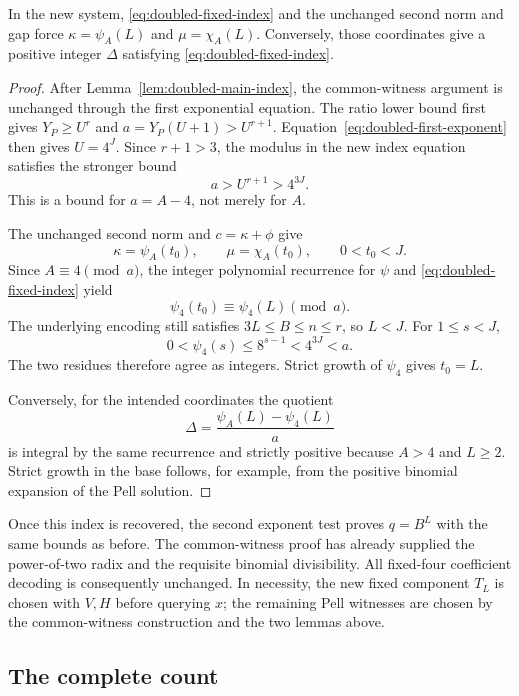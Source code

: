 \begin{lemma}\label{lem:doubled-fixed-index}
In the new system, \eqref{eq:doubled-fixed-index} and the unchanged
second norm and gap force
$\kappa=\psi_A(L)$ and $\mu=\chi_A(L)$.
Conversely, those coordinates give a positive integer $\Delta$
satisfying \eqref{eq:doubled-fixed-index}.
\end{lemma}
\begin{proof}
After Lemma~\ref{lem:doubled-main-index}, the common-witness argument
is unchanged through the first exponential equation. The ratio lower
bound first gives $Y_P\ge U^r$ and
$a=Y_P(U+1)>U^{r+1}$. Equation~\eqref{eq:doubled-first-exponent}
then gives $U=4^J$. Since $r+1>3$, the modulus in the new index
equation satisfies the stronger bound
\begin{equation}\label{eq:doubled-modulus-growth}
 a>U^{r+1}>4^{3J}.
\end{equation}
This is a bound for $a=A-4$, not merely for $A$.

The unchanged second norm and $c=\kappa+\phi$ give
\[
 \kappa=\psi_A(t_0),\qquad \mu=\chi_A(t_0),\qquad 0<t_0<J.
\]
Since $A\equiv4\pmod a$, the integer polynomial recurrence for
$\psi$ and \eqref{eq:doubled-fixed-index} yield
\[
 \psi_4(t_0)\equiv\psi_4(L)\pmod a.
\]
The underlying encoding still satisfies $3L\le B\le n\le r$,
so $L<J$. For $1\le s<J$,
\[
 0<\psi_4(s)\le8^{s-1}<4^{3J}<a.
\]
The two residues therefore agree as integers. Strict growth of
$\psi_4$ gives $t_0=L$.

Conversely, for the intended coordinates the quotient
\[
 \Delta=\frac{\psi_A(L)-\psi_4(L)}a
\]
is integral by the same recurrence and strictly positive because
$A>4$ and $L\ge2$. Strict growth in the base follows, for example,
from the positive binomial expansion of the Pell solution.
\end{proof}

Once this index is recovered, the second exponent test proves
$q=B^L$ with the same bounds as before. The common-witness proof has
already supplied the power-of-two radix and the requisite binomial
divisibility. All fixed-four coefficient decoding is consequently
unchanged. In necessity, the new fixed component $T_L$ is chosen with
$V,H$ before querying $x$; the remaining Pell witnesses are chosen by
the common-witness construction and the two lemmas above.

\subsection{The complete count}

